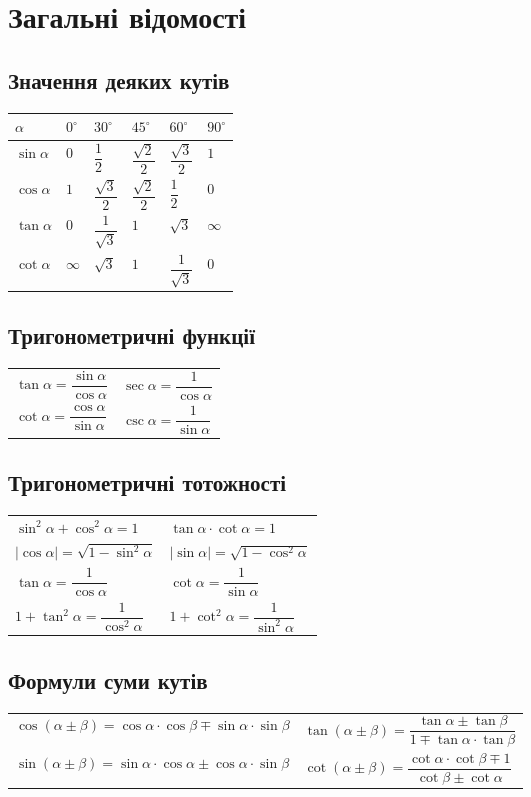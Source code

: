 \section{Загальні відомості}
\subsection{Значення деяких кутів}
{\renewcommand{\arraystretch}{2}
\begin{tabu}{|X[c]|X[c]|X[c]|X[c]|X[c]|X[c]|}
\hline
 $\alpha$ & $0^{\circ}$ & $30^{\circ}$ & $45^{\circ}$ & $60^{\circ}$ & $90^{\circ}$ \\
\hline
\hline
 $\sin\alpha$ & $0$ & $\dfrac{1}{2}$ & $\dfrac{\sqrt{2}}{2}$ & $\dfrac{\sqrt{3}}{2}$ & $1$ \\ 
\hline
 $\cos\alpha$ & $1$ & $\dfrac{\sqrt{3}}{2}$ & $\dfrac{\sqrt{2}}{2}$ & $\dfrac{1}{2}$ & $0$ \\ 
\hline
 $\tan\alpha$ & $0$ & $\dfrac{1}{\sqrt{3}}$ & $1$ & $\sqrt{3}$ & $\infty$ \\ 
\hline
 $\cot\alpha$ & $\infty$ & $\sqrt{3}$ & $1$ & $\dfrac{1}{\sqrt{3}}$ & $0$ \\ 
\hline
\end{tabu}}
\subsection{Тригонометричні функції}
{\renewcommand{\arraystretch}{2.5}
\begin{tabu}{X[c]X[c]}
$\tan\alpha=\dfrac{\sin\alpha}{\cos\alpha}$ & $\sec\alpha=\dfrac{1}{\cos\alpha}$\\
$\cot\alpha=\dfrac{\cos\alpha}{\sin\alpha}$ & $\csc\alpha=\dfrac{1}{\sin\alpha}$
\end{tabu}}
\subsection{Тригонометричні тотожності}
{\renewcommand{\arraystretch}{2.5}
\begin{tabu} to \textwidth {X[c]X[c]}
$\sin^{2}\alpha+\cos^{2}\alpha=1$ & $\tan\alpha\cdot\cot\alpha=1$\\
$|\cos\alpha|=\sqrt{1-\sin^{2}\alpha}$ & $|\sin\alpha|=\sqrt{1-\cos^{2}\alpha}$\\
$\tan\alpha=\dfrac{1}{\cos\alpha}$ & $\cot\alpha=\dfrac{1}{\sin\alpha}$\\
$1+\tan^{2}\alpha=\dfrac{1}{\cos^{2}\alpha}$ & $1+\cot^{2}\alpha=\dfrac{1}{\sin^{2}\alpha}$
\end{tabu}}
\subsection{Формули суми кутів}
{\renewcommand{\arraystretch}{2.5}
\begin{tabu}{X[c]X[c]}
$\cos(\alpha\pm\beta)=\cos\alpha\cdot\cos\beta\mp\sin\alpha\cdot\sin\beta$ & $\tan(\alpha\pm\beta)=\dfrac{\tan\alpha\pm\tan\beta}{1\mp\tan\alpha\cdot\tan\beta}$\\
$\sin(\alpha\pm\beta)=\sin\alpha\cdot\cos\alpha\pm\cos\alpha\cdot\sin\beta$ & $\cot(\alpha\pm\beta)=\dfrac{\cot\alpha\cdot\cot\beta\mp1}{\cot\beta\pm\cot\alpha}$
\end{tabu}}
